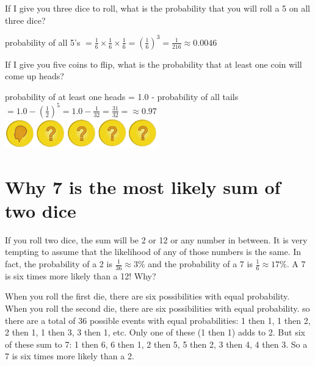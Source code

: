 \begin{Exercise}[title={Rolling Dice}, label=rolling-dice]
  If I give you three dice to roll, what is the
  probability that you will roll a 5 on all three dice?
\end{Exercise}
\begin{Answer}[ref=rolling-dice]
  probability of all 5's $ = \frac{1}{6}\times\frac{1}{6}\times\frac{1}{6} = \left(\frac{1}{6}\right)^3 = \frac{1}{216} \approx 0.0046$
  \end{Answer}
    
\begin{Exercise}[title={Flipping Coins}, label=flipping-coins]
  If I give you five coins to flip, what is the
  probability that at least one coin will come up heads?
\end{Exercise}
\begin{Answer}[ref=rolling-dice]
  probability of at least one heads = 1.0 - probability of all tails $ = 1.0 - \left(\frac{1}{2}\right)^5 =1.0 - \frac{1}{32} = \frac{31}{32} = \approx 0.97$ 
  \includegraphics[width=0.5\textwidth]{coin_prob.png}
\end{Answer}
    
\section{Why 7 is the most likely sum of two dice}

If you roll two dice, the sum will be 2 or 12 or any number in
between. It is very tempting to assume that the likelihood of any of
those numbers is the same. In fact, the probability of a 2 is
$\frac{1}{36} \approx 3\%$ and the probability of a 7 is $\frac{1}{6}
\approx 17\%$. A 7 is six times more likely than a 12! Why?

When you roll the first die, there are six possibilities with equal
probability. When you roll the second die, there are six possibilities
with equal probability. so there are a total of 36 possible events
with equal probabilities: 1 then 1, 1 then 2, 2 then 1, 1 then 3, 3
then 1, etc. Only one of these (1 then 1) adds to 2.  But six of these
sum to 7: 1 then 6, 6 then 1, 2 then 5, 5 then 2, 3 then 4, 4 then
3. So a 7 is six times more likely than a 2.

